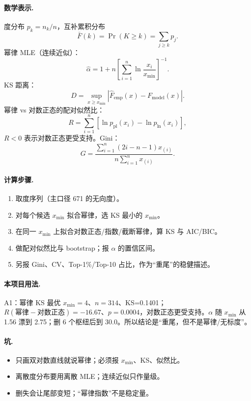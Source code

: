 \paragraph{数学表示.}
度分布 \(p_k=n_k/n\)，互补累积分布
\[
\bar F(k)=\Pr(K\ge k)=\sum_{j\ge k}p_j.
\]
幂律 MLE（连续近似）：
\[
\hat\alpha=1+n\left[\sum_{i=1}^{n}\ln\frac{x_i}{x_{\min}}\right]^{-1}.
\]
KS 距离：
\[
D=\sup_{x\ge x_{\min}}\left|\hat F_{\mathrm{emp}}(x)-F_{\mathrm{model}}(x)\right|.
\]
幂律 vs 对数正态的配对似然比：
\[
R=\sum_{i=1}^{n}\left[\ln p_{\mathrm{pl}}(x_i)-\ln p_{\mathrm{ln}}(x_i)\right],
\]
\(R<0\) 表示对数正态更受支持。Gini：
\[
G=\frac{\sum_{i=1}^{n}(2i-n-1)x_{(i)}}{n\sum_{i=1}^{n}x_{(i)}}.
\]

\paragraph{计算步骤.}
\begin{enumerate}
  \item 取度序列（主口径 671 的无向度）。
  \item 对每个候选 \(x_{\min}\) 拟合幂律，选 KS 最小的 \(x_{\min}\)。
  \item 在同一 \(x_{\min}\) 上拟合对数正态/指数/截断幂律，算 KS 与 AIC/BIC。
  \item 做配对似然比与 bootstrap；报 \(\alpha\) 的置信区间。
  \item 另报 Gini、CV、Top-1\%/Top-10 占比，作为“重尾”的稳健描述。
\end{enumerate}

\paragraph{本项目用法.}
\unit{A1}：幂律 KS 最优 \(x_{\min}=4\)、\(n=314\)、KS=0.1401；\(R(\text{幂律}-\text{对数正态})=-16.67\)、\(p=0.0004\)，对数正态更受支持。\(\alpha\) 随 \(x_{\min}\) 从 1.56 漂到 2.75；删 6 个枢纽后到 30.0。所以结论是“重尾，但不是幂律/无标度”。

\paragraph{坑.}
\begin{itemize}
  \item 只画双对数直线就说幂律；必须报 \(x_{\min}\)、KS、似然比。
  \item 离散度分布要用离散 MLE；连续近似只作量级。
  \item 删失会让尾部变短；“幂律指数”不是稳定量。
\end{itemize}

